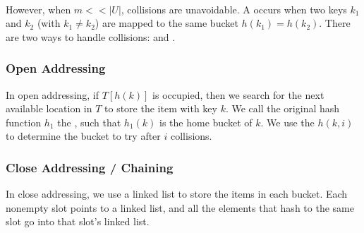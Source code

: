 {~~~}

However, when $m << |U|$, collisions are unavoidable. A  occurs when two keys $k_1$ and $k_2$ (with $k_1 \neq k_2$) are mapped to the same bucket $h(k_1) = h(k_2)$. There are two ways to handle collisions:  and .

\subsubsection{Open Addressing}

In open addressing, if $T[h(k)]$ is occupied, then we search for the next available location in $T$ to store the item with key $k$. We call the original hash function $h_1$ the , such that $h_1(k)$ is the home bucket of $k$. We use the  $h(k, i)$ to determine the bucket to try after $i$ collisions. 


\subsubsection{Close Addressing / Chaining}

In close addressing, we use a linked list to store the items in each bucket. Each nonempty slot points to a linked list, and all the elements that hash to the same slot go into that slot's linked list. 

